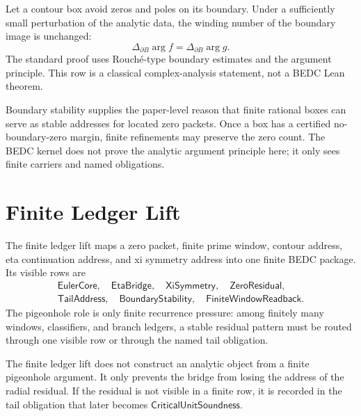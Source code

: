 \begin{principle}
\label{prin:rh-zeta-critical-unit-boundary-stability}
Let a contour box avoid zeros and poles on its boundary. Under a
sufficiently small perturbation of the analytic data, the winding number
of the boundary image is unchanged:
$$
\Delta_{\partial B}\arg f
=
\Delta_{\partial B}\arg g.
$$
The standard proof uses Rouch\'e-type boundary estimates and the
argument principle. This row is a classical complex-analysis statement,
not a BEDC Lean theorem.
\end{principle}

Boundary stability supplies the paper-level reason that finite rational
boxes can serve as stable addresses for located zero packets. Once a box
has a certified no-boundary-zero margin, finite refinements may preserve
the zero count. The BEDC kernel does not prove the analytic argument
principle here; it only sees finite carriers and named obligations.

\section{Finite Ledger Lift}
\label{sec:rh-zeta-critical-unit-finite-ledger-lift}

\begin{definition}
\label{def:rh-zeta-critical-unit-ledger-lift}
The finite ledger lift maps a zero packet, finite prime window, contour
address, eta continuation address, and xi symmetry address into one
finite BEDC package. Its visible rows are
$$
\begin{gathered}
\mathsf{EulerCore},\quad
\mathsf{EtaBridge},\quad
\mathsf{XiSymmetry},\quad
\mathsf{ZeroResidual},\\
\mathsf{TailAddress},\quad
\mathsf{BoundaryStability},\quad
\mathsf{FiniteWindowReadback}.
\end{gathered}
$$
The pigeonhole role is only finite recurrence pressure: among finitely
many windows, classifiers, and branch ledgers, a stable residual pattern
must be routed through one visible row or through the named tail
obligation.
\end{definition}

\begin{principle}
\label{prin:rh-zeta-critical-unit-no-hidden-analytic-inhabitant}
The finite ledger lift does not construct an analytic object from a
finite pigeonhole argument. It only prevents the bridge from losing the
address of the radial residual. If the residual is not visible in a
finite row, it is recorded in the tail obligation that later becomes
$\mathsf{CriticalUnitSoundness}$.
\end{principle}

